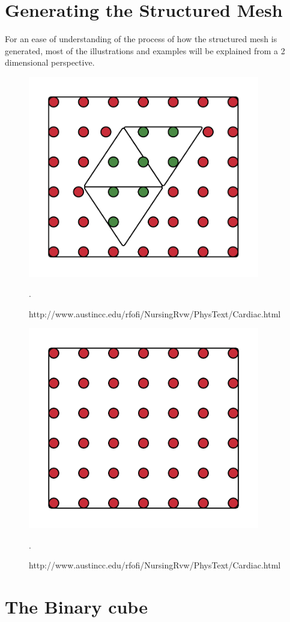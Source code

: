 \section{Generating the Structured Mesh}
\label{generating_the structured_mesh}
For an ease of understanding of the process of how the structured mesh is generated, most of the illustrations and examples will be explained from a 2 dimensional perspective.

\begin{figure}[h]
 \centering 
     \includegraphics[width=0.9\textwidth]{bilder/m_points_inside}
     \caption{http://www.austincc.edu/rfofi/NursingRvw/PhysText/Cardiac.html}.
     \label{m_points_inside.png}
\end{figure}

\begin{figure}[h]
 \centering 
     \includegraphics[width=0.9\textwidth]{bilder/m_grid_points}
     \caption{http://www.austincc.edu/rfofi/NursingRvw/PhysText/Cardiac.html}.
     \label{m_grid_points.png}
\end{figure}

\section{The Binary cube}




